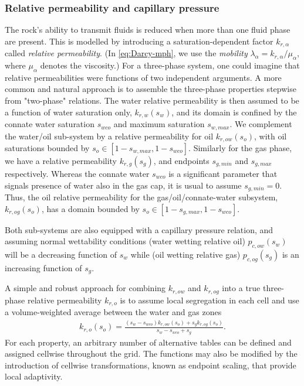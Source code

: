 \subsubsection{Relative permeability and capillary pressure}
\label{sec:relperm-cappress}
The rock's ability to transmit fluids is reduced when more than one fluid phase are
present. This is modelled by introducing a saturation-dependent factor $k_{r,\alpha}$
called \emph{relative permeability}. (In \eqref{eq:Darcy-mph}, {\revised we use} the
\emph{mobility} $\lambda_{\alpha}=k_{r,\alpha}/\mu_{\alpha}$, where $\mu_\alpha$ denotes
the viscosity.)  For a three-phase system, one could imagine that relative permeabilities
were functions of two independent arguments. A more common and natural approach is to
assemble the three-phase properties stepwise from "two-phase" relations. The water
relative permeability is then assumed to be a function of water saturation only,
$k_{r,w}(s_{w})$, and its domain is confined by the connate water saturation $s_{wco}$ and
maximum saturation $s_{w,max}$.  We complement the water/oil sub-system by a relative
permeability for oil $k_{r,ow}(s_{o})$, with oil saturations bounded by
$s_{o}\in [1-s_{w,max} ,1-s_{wco}]$. Similarly for the gas phase, we have a relative
permeability $k_{r,g}(s_{g})$, and endpoints $s_{g,min}$ and $s_{g,max}$ respectively.
Whereas the connate water $s_{wco}$ is a significant parameter that signals presence of
water also in the gas cap, it is usual to assume $s_{g,min}=0$.  Thus, the oil relative
permeability for the gas/oil/connate-water subsystem, $k_{r,og}(s_{o})$, has a domain
bounded by $s_{o}\in [1-s_{g,max},1-s_{wco}]$.

Both sub-systems are also equipped with a capillary pressure relation, 
and assuming normal wettability conditions (water wetting relative oil) $p_{c,ow}(s_{w})$ will be
a decreasing function of $s_{w}$ while (oil wetting relative gas) $p_{c,og}(s_{g})$ is an increasing 
function of $s_{g}$.

A simple and robust approach for combining $k_{r,ow}$ and $k_{r,og}$ into a true
three-phase relative permeability $k_{r,o}$ is to assume local segregation in each cell
and use a volume-weighted average between the water and gas zones
\begin{align}\label{eq:gwseg}
  k_{r,o}(s_{o}) = \frac{ (s_{w} - s_{wco})k_{r,ow}(s_{o}) + s_{g}k_{r,og}(s_{o})}
                      { s_{w} - s_{wco} + s_{g} }.
\end{align}
For each property, an arbitrary number of alternative tables can be defined and assigned
cellwise throughout the grid.  The functions may also be modified by the introduction of
cellwise transformations, known as endpoint scaling, that provide local adaptivity.

